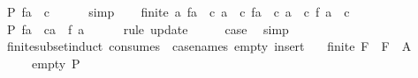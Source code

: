 \begin{isabellebody}
\ {\isachardoublequoteopen}P\ {\isacharparenleft}{\kern0pt}f{\isacharparenleft}{\kern0pt}a\ {\isacharcolon}{\kern0pt}{\isacharequal}{\kern0pt}\ c{\isacharparenright}{\kern0pt}{\isacharparenright}{\kern0pt}{\isachardoublequoteclose}\isanewline
\ \ \ \ \isamarkupfalse%
\ simp\isanewline
\ \ \isamarkupfalse%
\ {\isacartoucheopen}finite\ {\isacharbraceleft}{\kern0pt}a{\isacharprime}{\kern0pt}{\isachardot}{\kern0pt}\ {\isacharparenleft}{\kern0pt}f{\isacharparenleft}{\kern0pt}a\ {\isacharcolon}{\kern0pt}{\isacharequal}{\kern0pt}\ c{\isacharparenright}{\kern0pt}{\isacharparenright}{\kern0pt}\ a{\isacharprime}{\kern0pt}\ {\isasymnoteq}\ c{\isacharbraceright}{\kern0pt}{\isacartoucheclose}\ {\isacartoucheopen}{\isacharparenleft}{\kern0pt}f{\isacharparenleft}{\kern0pt}a\ {\isacharcolon}{\kern0pt}{\isacharequal}{\kern0pt}\ c{\isacharparenright}{\kern0pt}{\isacharparenright}{\kern0pt}\ a\ {\isacharequal}{\kern0pt}\ c{\isacartoucheclose}\ {\isacartoucheopen}f\ a\ {\isasymnoteq}\ c{\isacartoucheclose}\isanewline
\ \ \isamarkupfalse%
\ {\isachardoublequoteopen}P\ {\isacharparenleft}{\kern0pt}{\isacharparenleft}{\kern0pt}f{\isacharparenleft}{\kern0pt}a\ {\isacharcolon}{\kern0pt}{\isacharequal}{\kern0pt}\ c{\isacharparenright}{\kern0pt}{\isacharparenright}{\kern0pt}{\isacharparenleft}{\kern0pt}a\ {\isacharcolon}{\kern0pt}{\isacharequal}{\kern0pt}\ f\ a{\isacharparenright}{\kern0pt}{\isacharparenright}{\kern0pt}{\isachardoublequoteclose}\isanewline
\ \ \ \ \isamarkupfalse%
\ {\isacharparenleft}{\kern0pt}rule\ update{\isacharparenright}{\kern0pt}\isanewline
\ \ \isamarkupfalse%
\ \isamarkupfalse%
\ {\isacharquery}{\kern0pt}case\ \isamarkupfalse%
\ simp\isanewline
{}\isamarkupfalse%
%
\endisatagproof
{\isafoldproof}%
%
\isadelimproof
\isanewline
%
\endisadelimproof
\isanewline
{}\isamarkupfalse%
\ finite{\isacharunderscore}{\kern0pt}subset{\isacharunderscore}{\kern0pt}induct{\isacharprime}{\kern0pt}\ {\isacharbrackleft}{\kern0pt}consumes\ {}{\isacharcomma}{\kern0pt}\ case{\isacharunderscore}{\kern0pt}names\ empty\ insert{\isacharbrackright}{\kern0pt}{\isacharcolon}{\kern0pt}\isanewline
\ \ \ {\isachardoublequoteopen}finite\ F{\isachardoublequoteclose}\ \ {\isachardoublequoteopen}F\ {\isasymsubseteq}\ A{\isachardoublequoteclose}\isanewline
\ \ \ \ \ empty{\isacharcolon}{\kern0pt}\ {\isachardoublequoteopen}P\ {\isacharbraceleft}{\kern0pt}{\isacharbraceright}{\kern0pt}{\isachardoublequoteclose}\isanewline

\end{isabellebody}
